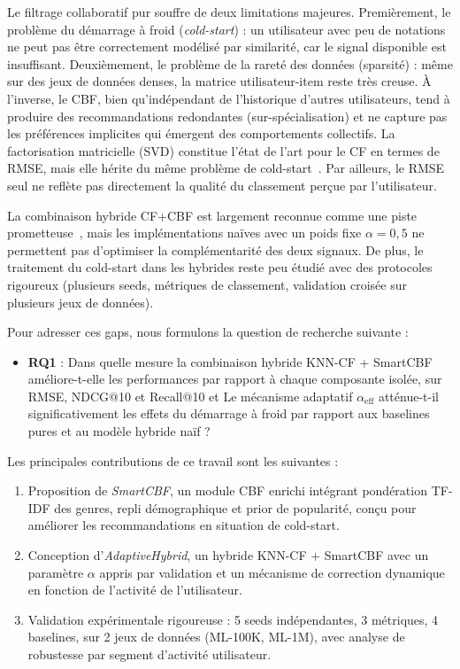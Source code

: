 \documentclass[conference]{IEEEtran}
\newcommand{\RQ}[1]{\textbf{RQ#1}}
\begin{document}
Le filtrage collaboratif pur souffre de deux limitations majeures. Premièrement,
le problème du démarrage à froid (\textit{cold-start}) : un utilisateur avec
peu de notations ne peut pas être correctement modélisé par similarité, car le
signal disponible est insuffisant. Deuxièmement, le problème de la rareté des
données (sparsité) : même sur des jeux de données denses, la matrice
utilisateur-item reste très creuse. À l'inverse, le CBF, bien qu'indépendant
de l'historique d'autres utilisateurs, tend à produire des recommandations
redondantes (sur-spécialisation) et ne capture pas les préférences implicites
qui émergent des comportements collectifs. La factorisation matricielle (SVD)
constitue l'état de l'art pour le CF en termes de RMSE, mais elle hérite du
même problème de cold-start~\cite{koren2009}. Par ailleurs, le RMSE seul ne
reflète pas directement la qualité du classement perçue par l'utilisateur.

La combinaison hybride CF+CBF est largement reconnue comme une piste
prometteuse~\cite{burke2002,ricci2011}, mais les implémentations naïves avec
un poids fixe $\alpha = 0{,}5$ ne permettent pas d'optimiser la
complémentarité des deux signaux. De plus, le traitement du cold-start dans
les hybrides reste peu étudié avec des protocoles rigoureux (plusieurs seeds,
métriques de classement, validation croisée sur plusieurs jeux de données).

Pour adresser ces gaps, nous formulons la question de recherche suivante :
\begin{itemize}
    \item \RQ{1} : Dans quelle mesure la combinaison hybride KNN-CF + SmartCBF
          améliore-t-elle les performances par rapport à chaque composante
          isolée, sur RMSE, NDCG@10 et Recall@10 et Le mécanisme adaptatif $\alpha_{\text{eff}}$ atténue-t-il
          significativement les effets du démarrage à froid par rapport aux
          baselines pures et au modèle hybride naïf ?
\end{itemize}

Les principales contributions de ce travail sont les suivantes :
\begin{enumerate}
    \item Proposition de \textit{SmartCBF}, un module CBF enrichi intégrant
          pondération TF-IDF des genres, repli démographique et prior de
          popularité, conçu pour améliorer les recommandations en situation
          de cold-start.
    \item Conception d'\textit{AdaptiveHybrid}, un hybride KNN-CF + SmartCBF
          avec un paramètre $\alpha$ appris par validation et un mécanisme de
          correction dynamique en fonction de l'activité de l'utilisateur.
    \item Validation expérimentale rigoureuse : 5 seeds indépendantes, 3
          métriques, 4 baselines, sur 2 jeux de données (ML-100K, ML-1M),
          avec analyse de robustesse par segment d'activité utilisateur.
\end{enumerate}
\end{document}
